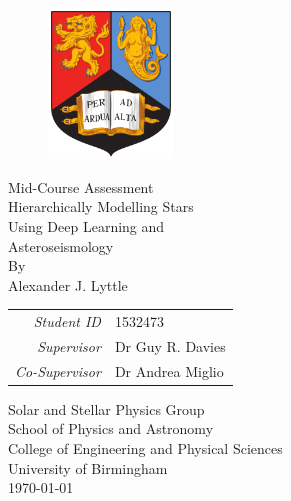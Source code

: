 \thispagestyle{empty}
\providecommand\pdfbookmark[3][]{} \pdfbookmark[0]{Title Page}{bm:Title}
\vspace*{1cm}
\begin{figure}[ht!]
    \centering
    \includegraphics[height=4cm]{frontmatter/images/BirminghamUniversityCrest.png}
\end{figure}
\vfill
\begin{center}
    {\large{Mid-Course Assessment}}\\[1.0em]
    {\huge{Hierarchically Modelling Stars}}\\[0.5em]
    {\huge{Using Deep Learning and}}\\[0.5em]
    {\huge{Asteroseismology}}\\[0.5em]
    \vfill
    By\\[\baselineskip]
    {\Large{Alexander J. Lyttle}}
    \vfill
    \begin{tabular}{rl}
        \emph{Student ID} & 1532473\\[-0.8em]
        \emph{Supervisor} & Dr Guy R. Davies\\[-0.8em]
        \emph{Co-Supervisor} & Dr Andrea Miglio\\[-0.8em] 
    \end{tabular}
\end{center}
\begin{center}
    Solar and Stellar Physics Group\\[-0.8em]
    School of Physics and Astronomy\\[-0.8em]
    College of Engineering and Physical Sciences\\[-0.8em]
    University of Birmingham\\[1.0em]
    \today\\[\baselineskip]
\end{center}
\clearpage

